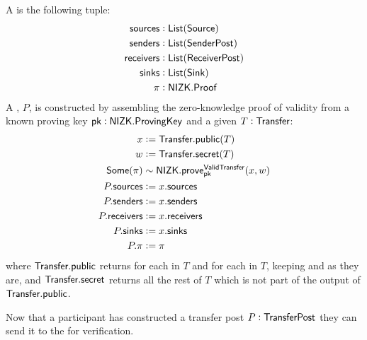 \begin{definition}
    A \TransferPost{} is the following tuple:
    \begin{align*}
        {\textsf{sources}}    &: {\textsf{List}}({\textsf{Source}}) \\
        {\textsf{senders}}    &: {\textsf{List}}({\textsf{SenderPost}}) \\
        {\textsf{receivers}}  &: {\textsf{List}}({\textsf{ReceiverPost}}) \\
        {\textsf{sinks}}      &: {\textsf{List}}({\textsf{Sink}}) \\
        \pi         &: {\textsf{NIZK}}.{\textsf{Proof}} 
    \end{align*}
    A \TransferPost{}, $P$, is constructed by assembling the zero-knowledge proof of \Transfer{} validity from a known proving key ${\textsf{pk}} : {\textsf{NIZK}}.{\textsf{ProvingKey}}$ and a given $T : {\textsf{Transfer}}$:
    \begin{align*}
        x             &:= {\textsf{Transfer}}.{\textsf{public}}(T) \\
        w             &:= {\textsf{Transfer}}.{\textsf{secret}}(T) \\
        {\textsf{Some}}(\pi)    &\sim {\textsf{NIZK}}.{\textsf{prove}}^{\textsf{ValidTransfer}}_{\textsf{pk}}(x, w) \\
        P.{\textsf{sources}}    &:= x.{\textsf{sources}} \\
        P.{\textsf{senders}}    &:= x.{\textsf{senders}} \\
        P.{\textsf{receivers}}  &:= x.{\textsf{receivers}} \\
        P.{\textsf{sinks}}      &:= x.{\textsf{sinks}} \\
        P.\pi         &:= \pi
    \end{align*}
    where ${\textsf{Transfer}}.{\textsf{public}}$ returns  for each \Sender{} in $T$ and  for each \Receiver{} in $T$, keeping  and  as they are, and ${\textsf{Transfer}}.{\textsf{secret}}$ returns all the rest of $T$ which is not part of the output of ${\textsf{Transfer}}.{\textsf{public}}$.
\end{definition}

Now that a participant has constructed a transfer post $P : {\textsf{TransferPost}}$ they can send it to the \Ledger{} for verification. 

